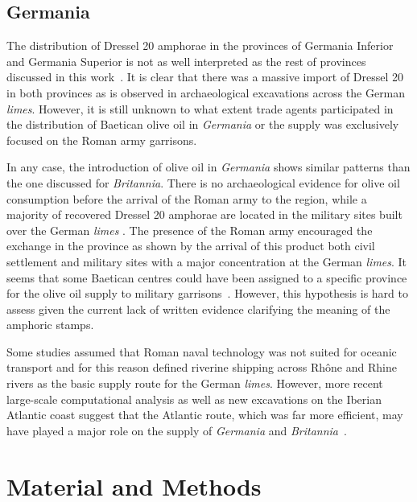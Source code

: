 \subsection{Germania}
\label{sec:4}

The distribution of Dressel 20 amphorae in the provinces of Germania Inferior and Germania Superior is not as well interpreted as the rest of provinces discussed in this work~\citep[293]{remesal_baetica_2002}. It is clear that there was a massive import of Dressel 20 in both provinces as is observed in archaeological excavations across the German \textit{limes}. However, it is still unknown to what extent trade agents participated in the distribution of Baetican olive oil in \textit{Germania} or the supply was exclusively focused on the Roman army garrisons\citep[156]{remesal_germn_2010}.

In any case, the introduction of olive oil in \textit{Germania} shows similar patterns than the one discussed for \textit{Britannia}. There is no archaeological evidence for olive oil consumption before the arrival of the Roman army to the region, while a majority of recovered Dressel 20 amphorae are located in the military sites built over the German \textit{limes} \citep{remesal_germaniaengl_2002}. The presence of the Roman army encouraged the exchange in the province as shown by the arrival of this product both civil settlement and military sites with a major concentration at the German \textit{limes}. It seems that some Baetican centres could have been assigned to a specific province for the olive oil supply to military garrisons~\citep[125]{remesal_concierto}. However, this hypothesis is hard to assess given the current lack of written evidence clarifying the meaning of the amphoric stamps. 

Some studies assumed that Roman naval technology was not suited for oceanic transport and for this reason defined riverine shipping across Rhône and Rhine rivers as the basic supply route for the German \textit{limes}. However, more recent large-scale computational analysis as well as new excavations on the Iberian Atlantic coast suggest that the Atlantic route, which was far more efficient, may have played a major role on the supply of \textit{Germania} and \textit{Britannia}~\citep{rubio-campillo_ecology_2018}.


\section{Material and Methods}
\label{sec:5}


